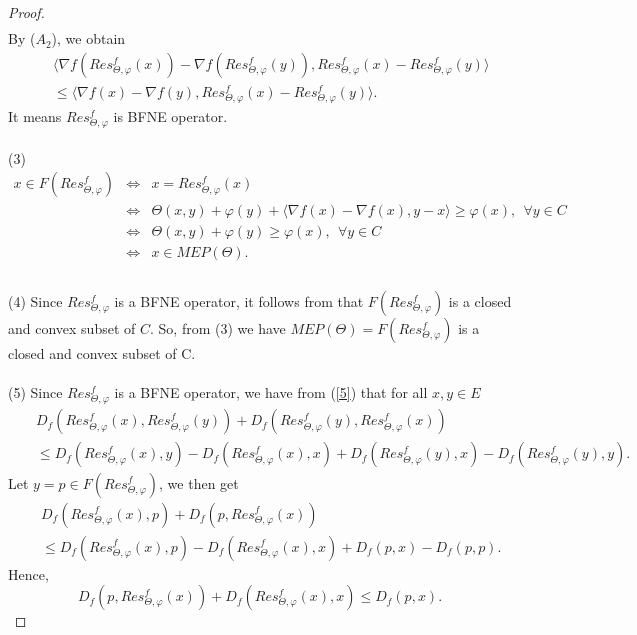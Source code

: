 \documentclass[reqno,b5paper]{amsart}
\theoremstyle{plain}
\theoremstyle{definition}
\numberwithin{equation}{section}
\numberwithin{equation}{section}
\begin{document}
\begin{proof}
\begin{eqnarray*}
\end{eqnarray*}
By ($A_{2}$), we obtain
\begin{eqnarray*}
&&\langle \nabla f(Res_{\Theta,\varphi}^{f}(x))-\nabla f(Res_{\Theta,\varphi}^{f}(y)),Res_{\Theta,\varphi}^{f}(x)-Res_{\Theta,\varphi}^{f}(y)\rangle\\
&&\leq\langle \nabla f(x)-\nabla f(y),Res_{\Theta,\varphi}^{f}(x)-Res_{\Theta,\varphi}^{f}(y)\rangle.
\end{eqnarray*}
It means $Res_{\Theta,\varphi}^{f}$ is BFNE operator.\\
\\
(3) 
\begin{eqnarray*}
x\in F(Res_{\Theta,\varphi}^{f})&\Leftrightarrow& x=Res_{\Theta,\varphi}^{f}(x)\\
&\Leftrightarrow& \Theta (x,y)+\varphi(y)+\langle \nabla f(x)-\nabla f(x),y-x\rangle\geq \varphi(x), \ \ \forall y\in C\\
&\Leftrightarrow& \Theta (x,y)+\varphi(y)\geq \varphi(x), \ \ \forall y\in C\\
&\Leftrightarrow& x\in MEP(\Theta).\\
\end{eqnarray*}
\\
(4) Since $Res_{\Theta,\varphi}^{f}$ is a BFNE operator, it follows from \cite[Lemma 1.3.1]{rei3} that $F(Res_{\Theta,\varphi}^{f})$ is a closed and convex subset of $C$. So, from (3) we have $MEP(\Theta)=F(Res_{\Theta,\varphi}^{f})$ is a closed and convex subset of C.\\
\\
(5) Since $Res_{\Theta,\varphi}^{f}$ is a BFNE operator, we have from (\ref{5}) that for all $x,y\in E$
\begin{eqnarray*}
&&D_{f}(Res_{\Theta,\varphi}^{f}(x),Res_{\Theta,\varphi}^{f}(y))+D_{f}(Res_{\Theta,\varphi}^{f}(y),Res_{\Theta,\varphi}^{f}(x))\\
&&\leq D_{f}(Res_{\Theta,\varphi}^{f}(x),y)-D_{f}(Res_{\Theta,\varphi}^{f}(x),x)+D_{f}(Res_{\Theta,\varphi}^{f}(y),x)-D_{f}(Res_{\Theta,\varphi}^{f}(y),y).
\end{eqnarray*}
Let $y=p\in F(Res_{\Theta,\varphi}^{f})$, we then get
\begin{eqnarray*}
&&D_{f}(Res_{\Theta,\varphi}^{f}(x),p)+D_{f}(p,Res_{\Theta,\varphi}^{f}(x))\\
&&\leq D_{f}(Res_{\Theta,\varphi}^{f}(x),p)-D_{f}(Res_{\Theta,\varphi}^{f}(x),x)+D_{f}(p,x)-D_{f}(p,p).
\end{eqnarray*}
Hence, 
$$D_{f}(p,Res_{\Theta,\varphi}^{f}(x))+D_{f}(Res_{\Theta,\varphi}^{f}(x),x)\leq D_{f}(p,x).$$
\end{proof}
\end{document}
